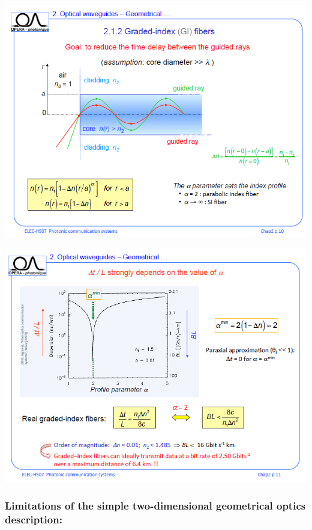 \begin{center}
	\includegraphics[scale=0.5]{ch1/image8.png}
\end{center}

\begin{center}
	\includegraphics[scale=0.5]{ch1/image9.png}
\end{center}


\subsubsection{Limitations of the simple two-dimensional geometrical optics description:}

